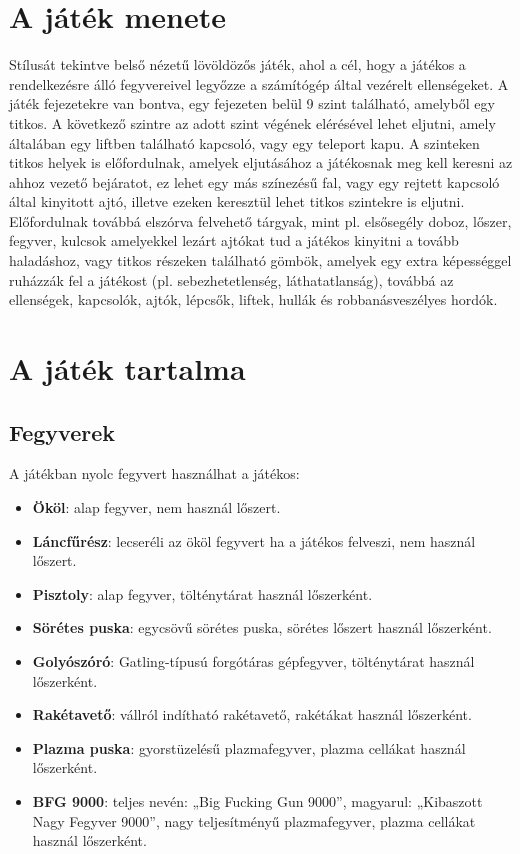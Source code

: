 \documentclass{thesis-ekf}
\theoremstyle{definition}
\theoremstyle{remark}
\begin{document}
\section{A játék menete}

Stílusát tekintve belső nézetű lövöldözős játék, ahol a cél, hogy a játékos a
rendelkezésre álló fegyvereivel legyőzze a számítógép által vezérelt
ellenségeket. A játék fejezetekre van bontva, egy fejezeten belül 9 szint
található, amelyből egy titkos. A következő szintre az adott szint végének
elérésével lehet eljutni, amely általában egy liftben található kapcsoló, vagy
egy teleport kapu. A szinteken titkos helyek is előfordulnak, amelyek
eljutásához a játékosnak meg kell keresni az ahhoz vezető bejáratot, ez lehet
egy más színezésű fal, vagy egy rejtett kapcsoló által kinyitott ajtó, illetve
ezeken keresztül lehet titkos szintekre is eljutni. Előfordulnak továbbá
elszórva felvehető tárgyak, mint pl. elsősegély doboz, lőszer, fegyver, kulcsok
amelyekkel lezárt ajtókat tud a játékos kinyitni a tovább haladáshoz, vagy
titkos részeken található gömbök, amelyek egy extra képességgel ruházzák fel a
játékost (pl. sebezhetetlenség, láthatatlanság), továbbá az ellenségek,
kapcsolók, ajtók, lépcsők, liftek, hullák és robbanásveszélyes hordók.

\section{A játék tartalma}

\subsection{Fegyverek}

A játékban nyolc fegyvert használhat a játékos:

\begin{itemize}
    \item \textbf{Ököl}: alap fegyver, nem használ lőszert.
    \item \textbf{Láncfűrész}: lecseréli az ököl fegyvert ha a játékos felveszi,
        nem használ lőszert.
    \item \textbf{Pisztoly}: alap fegyver, tölténytárat használ lőszerként.
    \item \textbf{Sörétes puska}: egycsövű sörétes puska, sörétes lőszert
        használ lőszerként.
    \item \textbf{Golyószóró}: Gatling-típusú forgótáras gépfegyver,
        tölténytárat használ lőszerként.
    \item \textbf{Rakétavető}: vállról indítható rakétavető, rakétákat használ
        lőszerként.
    \item \textbf{Plazma puska}: gyorstüzelésű plazmafegyver, plazma cellákat
        használ lőszerként.
    \item \textbf{BFG 9000}: teljes nevén: „Big Fucking Gun 9000”, magyarul:
        „Kibaszott Nagy Fegyver 9000”, nagy teljesítményű plazmafegyver, plazma
        cellákat használ lőszerként.
\end{itemize}
\end{document}
